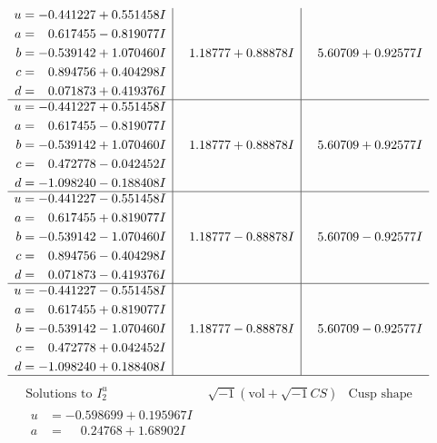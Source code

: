 \documentclass[1p]{elsarticle_modified}
\theoremstyle{definition}
\newcommand{\I}{\sqrt{-1}}
\begin{document}
$$\begin{array}{c|c|c}
\begin{aligned}
u &= -0.441227 + 0.551458 I \\
a &= \phantom{-}0.617455 - 0.819077 I \\
b &= -0.539142 + 1.070460 I \\
c &= \phantom{-}0.894756 + 0.404298 I \\
d &= \phantom{-}0.071873 + 0.419376 I\end{aligned}
 & \phantom{-}1.18777 + 0.88878 I & \phantom{-}5.60709 + 0.92577 I \\ \hline\begin{aligned}
u &= -0.441227 + 0.551458 I \\
a &= \phantom{-}0.617455 - 0.819077 I \\
b &= -0.539142 + 1.070460 I \\
c &= \phantom{-}0.472778 - 0.042452 I \\
d &= -1.098240 - 0.188408 I\end{aligned}
 & \phantom{-}1.18777 + 0.88878 I & \phantom{-}5.60709 + 0.92577 I \\ \hline\begin{aligned}
u &= -0.441227 - 0.551458 I \\
a &= \phantom{-}0.617455 + 0.819077 I \\
b &= -0.539142 - 1.070460 I \\
c &= \phantom{-}0.894756 - 0.404298 I \\
d &= \phantom{-}0.071873 - 0.419376 I\end{aligned}
 & \phantom{-}1.18777 - 0.88878 I & \phantom{-}5.60709 - 0.92577 I \\ \hline\begin{aligned}
u &= -0.441227 - 0.551458 I \\
a &= \phantom{-}0.617455 + 0.819077 I \\
b &= -0.539142 - 1.070460 I \\
c &= \phantom{-}0.472778 + 0.042452 I \\
d &= -1.098240 + 0.188408 I\end{aligned}
 & \phantom{-}1.18777 - 0.88878 I & \phantom{-}5.60709 - 0.92577 I\\
 \hline 
 \end{array}$$\newpage$$\begin{array}{c|c|c}  
\text{Solutions to }I^u_{2}& \I (\text{vol} + \sqrt{-1}CS) & \text{Cusp shape}\\
 \hline 
\begin{aligned}
u &= -0.598699 + 0.195967 I \\
a &= \phantom{-}0.24768 + 1.68902 I \\

\end{aligned}
\end{array}$$
\end{document}
